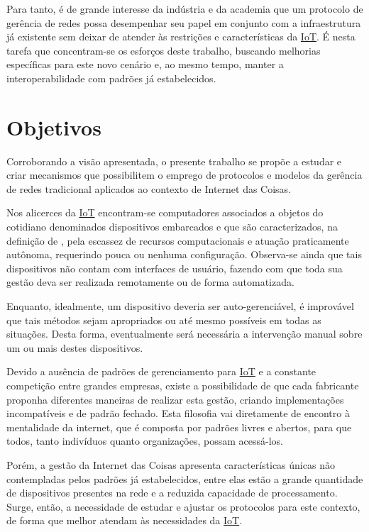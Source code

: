 \documentclass[twoside,english,brazilian]{UNISINOSmonografia}
\begin{document}
	Para tanto, é de grande interesse da indústria e da academia que um 
	protocolo de gerência de redes possa desempenhar seu papel em conjunto com 
	a infraestrutura já existente sem deixar de atender às restrições e 
	características da \hyperref[siglas]{IoT}. É nesta tarefa que concentram-se os esforços deste 
	trabalho, buscando melhorias específicas para este novo cenário e, ao 
	mesmo tempo, manter a interoperabilidade com padrões já estabelecidos.
	
\section{Objetivos}

	Corroborando a visão apresentada, o presente trabalho se propõe a estudar 
	e 
	criar mecanismos que possibilitem o emprego de protocolos e modelos da 
	gerência de redes tradicional aplicados ao contexto de Internet das 
	Coisas. 
	
	Nos alicerces da \hyperref[siglas]{IoT} encontram-se computadores associados a objetos do 
	cotidiano denominados dispositivos embarcados e que são caracterizados, 
	na definição de , pela escassez de recursos 
	computacionais e atuação praticamente autônoma, requerindo pouca ou 
	nenhuma configuração.
	Observa-se ainda que tais dispositivos não contam 
	com interfaces de usuário, fazendo com que toda sua gestão deva ser 
	realizada remotamente ou de forma automatizada. 

	Enquanto, idealmente, um 
	dispositivo deveria ser auto-gerenciável, é improvável que tais métodos 
	sejam apropriados ou até mesmo possíveis em todas as situações. Desta 
	forma, eventualmente será 
	necessária a intervenção manual sobre um ou mais destes dispositivos.

	Devido a ausência de padrões de gerenciamento para \hyperref[siglas]{IoT}
	e a constante competição entre grandes empresas, existe a possibilidade
	de que cada  fabricante  proponha diferentes maneiras de realizar 
	esta gestão, criando implementações incompatíveis e de padrão fechado. 
	Esta filosofia vai diretamente 
	de encontro à mentalidade da internet, que é composta por padrões livres e 
	abertos,
	para que todos, tanto indivíduos quanto organizações, possam acessá-los.

	Porém, a gestão da Internet das Coisas apresenta características únicas 
	não contempladas pelos padrões já estabelecidos, entre elas estão a grande 
	quantidade de dispositivos presentes na rede e a reduzida capacidade de 
	processamento. Surge, então, a necessidade de estudar e ajustar os 
	protocolos para este contexto, de forma que melhor atendam às 
	necessidades da \hyperref[siglas]{IoT}.
\end{document}

